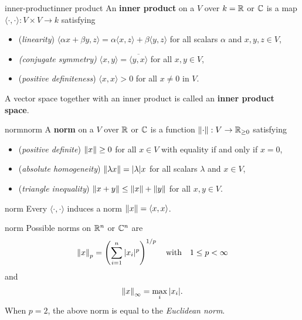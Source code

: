 \begin{topic}{inner-product}{inner product}
    An \textbf{inner product} on a  $V$ over $k = \mathbb{R}$ or $\mathbb{C}$ is a map $\langle \cdot, \cdot \rangle : V \times V \to k$ satisfying
    \begin{itemize}
        \item (\textit{linearity}) $\langle \alpha x + \beta y, z \rangle = \alpha \langle x, z \rangle + \beta \langle y, z \rangle$ for all scalars $\alpha$ and $x, y, z \in V$,
        \item \textit{(conjugate symmetry)} $\langle x, y \rangle = \overline{\langle y, x \rangle}$ for all $x, y \in V$,
        \item (\textit{positive definiteness}) $\langle x, x \rangle > 0$ for all $x \ne 0$ in $V$.
    \end{itemize}
    A vector space together with an inner product is called an \textbf{inner product space}.
\end{topic}

\begin{topic}{norm}{norm}
    A \textbf{norm} on a  $V$ over $\mathbb{R}$ or $\mathbb{C}$ is a function $\left\|\cdot\right\| : V \to \mathbb{R}_{\ge 0}$ satisfying
    \begin{itemize}
        \item (\textit{positive definite}) $\left\|x\right\| \ge 0$ for all $x \in V$ with equality if and only if $x = 0$,
        \item (\textit{absolute homogeneity}) $\left\|\lambda x\right\| = |\lambda| x$ for all scalars $\lambda$ and $x \in V$,
        \item (\textit{triangle inequality}) $\left\|x + y\right\| \le \left\|x\right\| + \left\|y\right\|$ for all $x, y \in V$.
    \end{itemize}
\end{topic}

\begin{example}{norm}
    Every  $\langle \cdot, \cdot \rangle$ induces a norm $\left\|x\right\| = \langle x, x \rangle$.
\end{example}

\begin{example}{norm}
    Possible norms on $\mathbb{R}^n$ or $\mathbb{C}^n$ are
    \[ \left\|x\right\|_p = \left( \sum_{i = 1}^n |x_i|^p \right)^{1/p} \quad \text{with} \quad 1 \le p < \infty \]
    and
    \[ \left\|x\right\|_\infty = \max_{i} |x_i| . \]
    When $p = 2$, the above norm is equal to the \textit{Euclidean norm}.
\end{example}

